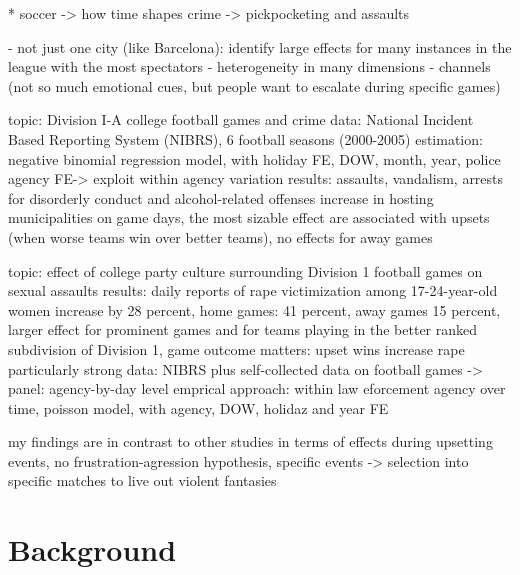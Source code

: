\documentclass[11pt, a4paper]{article} %
\begin{document}
	* soccer
		-> how time shapes crime \cite{montolio2016time}
		-> pickpocketing and assaults \cite{montolio2019measuring}
	
	
	
- not just one city (like Barcelona): identify large effects for many instances in the league with the most spectators
- heterogeneity in many dimensions
- channels (not so much emotional cues, but people want to escalate during specific games)





\cite{rees2009college}
topic: Division I-A college football games and crime
data: National Incident Based Reporting System (NIBRS), 6 football seasons (2000-2005)
estimation: negative binomial regression model, with holiday FE, DOW, month, year, police agency FE-> exploit within agency variation
results: assaults, vandalism, arrests for disorderly conduct and alcohol-related offenses increase in hosting municipalities on game days, the most sizable effect are associated with upsets (when worse teams win over better teams), no effects for away games


\cite{lindo2018college}
topic: effect of college party culture surrounding Division 1 football games on sexual assaults
results: daily reports of rape victimization among 17-24-year-old women increase by 28 percent, home games: 41 percent, away games 15 percent, larger effect for prominent games and for teams playing in the better ranked subdivision of Division 1, game outcome matters: upset wins increase rape particularly strong
data: NIBRS plus self-collected data on football games -> panel: agency-by-day level
emprical approach: within law eforcement agency over time, poisson model, with agency, DOW, holidaz and year FE



my findings are in contrast to other studies in terms of effects during upsetting events, no frustration-agression hypothesis, specific events -> selection into specific matches to live out violent fantasies

\newpage
\section{Background}\label{sec_soc_ext:background}
\end{document}

